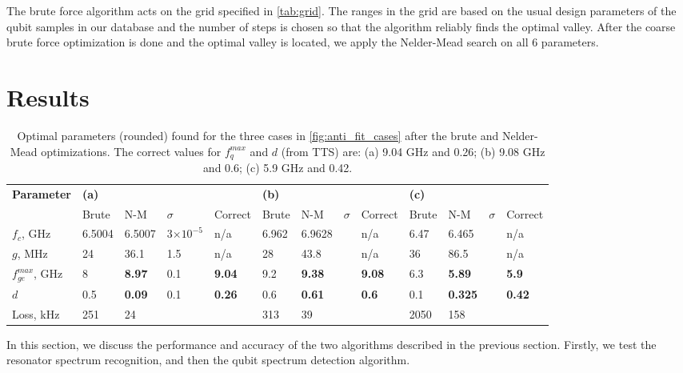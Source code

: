 \documentclass[%
 aip,
 draft,
 amsmath,amssymb,
 reprint,%
]{revtex4-1}
\begin{document}
The brute force algorithm acts on the grid specified in \autoref{tab:grid}. The ranges in the grid are based on the usual design parameters of the qubit samples in our database and the number of steps is chosen so that the algorithm reliably finds the optimal valley. After the coarse brute force optimization is done and the optimal valley is located, we apply the Nelder-Mead search on all 6 parameters.


\section{Results}

\begin{table}
	\centering
	\begin{ruledtabular}
		\renewcommand{\arraystretch}{1.2}

		\begin{tabular}{*{13}{l}} 
			\multirow{2}{*}{\textbf{Parameter}} & 
			\multicolumn{4}{l}{\textbf{(a)}} & 
			\multicolumn{4}{l}{\textbf{(b)}} & \multicolumn{4}{l}{\textbf{(c)}}\\
			& Brute & N-M & $\sigma$& Correct  & Brute & N-M & $\sigma$ & Correct  & Brute& N-M & $\sigma$ & Correct  \\
			\hline
			$f_c$, GHz &6.5004 & 6.5007 &  3$\times 10^{-5}$ & n/a & 6.962 & 6.9628 & & n/a &  6.47 & 6.465& & n/a\\ 
			$g$, MHz & 24 & 36.1 & 1.5 & n/a & 28 & 43.8 & & n/a & 36 & 86.5&&n/a\\
			$f_{ge}^{max}$, GHz & 8 &\textbf{8.97} & 0.1 & \textbf{9.04} &9.2& \textbf{9.38}& & \textbf{9.08}& 6.3& \textbf{5.89}&&\textbf{5.9}\\
			$d$ &0.5& \textbf{0.09}& 0.1& \textbf{0.26} &0.6&\textbf{0.61} &&\textbf{0.6}&0.1& \textbf{0.325} &&\textbf{0.42} \\\hline
			Loss, kHz & 251 & 24&& &313& 39 & & &2050& 158&&
		\end{tabular} 
	\end{ruledtabular}
	\caption{Optimal parameters (rounded) found for the three cases in \autoref{fig:anti_fit_cases} after the brute and Nelder-Mead optimizations. The correct values for $f_q^{max}$ and $d$ (from TTS) are: (a) 9.04 GHz and 0.26; (b) 9.08 GHz and 0.6; (c) 5.9 GHz and 0.42.}
	\label{tab:sts_results}
\end{table}

In this section, we discuss the performance and accuracy of the two algorithms described in the previous section. Firstly, we test the resonator spectrum recognition, and then the qubit spectrum detection algorithm.
\end{document}
